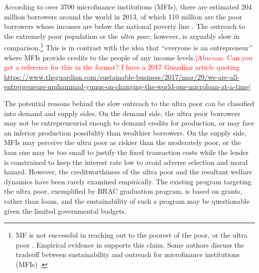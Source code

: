 	According to over 3700 microfinance institutions (MFIs), there are estimated 204 million borrowers around the world in 2013, of which 110 million are the poor borrowers whose incomes are below the national poverty line \citep{MFGateway2015}. The outreach to the extremely poor population or the \textit{ultra poor}, however, is arguably slow in comparison.\footnote{MF is not successful in reaching out to the poorest of the poor, or the ultra poor \citep[][]{Scully2004}. Empirical evidence in \citet{Yaron1994, Navajas2000, RahmanRazzaque2000, AghionMorduch2007} supports this claim. Some authors discuss the tradeoff between sustainability and outreach for microfinance institutions (MFIs) \citet{HermesLensink2011, HermesLensinkMeesters2011, Cull2011}. } This is in contrast with the idea that ``everyone is an entrepreneur'' where MFIs provide credits to the people of any income levels.\textcolor{red}{[Abu-san: Can you get a reference for this in the \BibTeX format? I have a 2017 Guardian article quoting \href{we are all entrepreneurs}{https://www.theguardian.com/sustainable-business/2017/mar/29/we-are-all-entrepreneurs-muhammad-yunus-on-changing-the-world-one-microloan-at-a-time}]}

	The potential reasons behind the slow outreach to the ultra poor can be classified into demand and supply sides. On the demand side, the ultra poor borrowers may not be entrepreneurial enough to demand credits for production, or may face an inferior production possibility than wealthier borrowers. On the supply side, MFIs may perceive the ultra poor as riskier than the moderately poor, or the loan size may be too small to justify the fixed transaction costs while the lender is constrained to keep the interest rate low to avoid adverse selection and moral hazard. However, the creditworthiness of the ultra poor and the resultant welfare dynamics have been rarely examined empirically. The existing program targeting the ultra poor, exemplified by BRAC graduation program, is based on grants, rather than loans, and the sustainability of such a program may be questionable given the limited governmental budgets.

